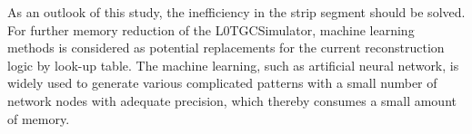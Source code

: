 As an outlook of this study, the inefficiency in the strip segment should be solved. For further memory reduction of the L0TGCSimulator, machine learning methods is considered as potential replacements for the current reconstruction logic by look-up table. The machine learning, such as artificial neural network, is widely used to generate various complicated patterns with a small number of network nodes with adequate precision, which thereby consumes a small amount of memory. 
